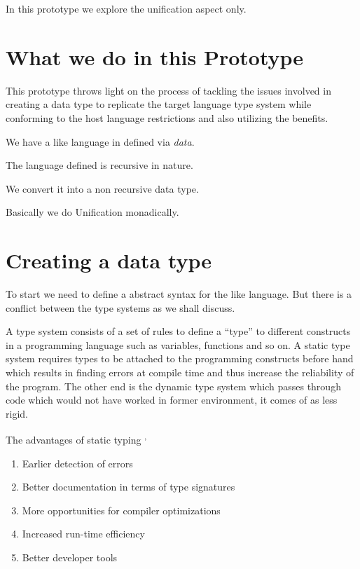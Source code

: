 \documentclass[thesis-solanki.tex]{subfiles}
\begin{document}
In this prototype we explore the unification aspect only.

\section{What we do in this Prototype}
This prototype throws light on the process of tackling the issues involved in creating
a data type to replicate the target language type system while conforming to the host language restrictions and also utilizing the
benefits.


We have a  like language in  defined via \textit{data}.

The language defined is recursive in nature.

We convert it into a non recursive
data type.


Basically we do Unification
monadically.


\section{Creating a data type}

To start we need to define a abstract syntax for the  like language.
But there is a conflict between the type systems as we shall discuss.


A type system consists of a set of rules to define a ``type'' to different constructs in a
programming language such as variables, functions and so on.
A static type system requires types to be attached to the programming constructs before hand which results in
finding errors at compile time and thus increase the reliability of the program.
The other end is the dynamic type system which passes through code which would not have worked in former
environment, it comes of as less rigid.



The advantages of static typing \cite{meijer2004static}\textsuperscript{,}
\begin{enumerate}
\item Earlier detection of errors
\item Better documentation in terms of type signatures
\item More opportunities for compiler optimizations
\item Increased run-time efficiency
\item Better developer tools
\end{enumerate}
\end{document}
